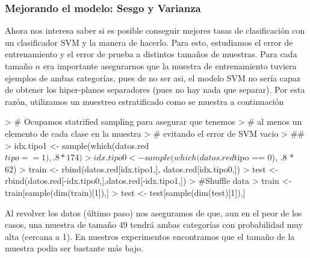\documentclass{article}
\begin{document}
\subsubsection{Mejorando el modelo: Sesgo y Varianza}
Ahora nos interesa saber si es posible conseguir mejores tasas de clasificación con un clasificador SVM y la manera de hacerlo. Para esto, estudiamos el error de entrenamiento y el error de prueba a distintos tamaños de muestras. Para cada tamaño $n$ era importante asegurarnos que la muestra de entrenamiento tuviera ejemplos de ambas categorías, pues de no ser asi, el modelo SVM no sería capaz de obtener los hiper-planos separadores (pues no hay nada que separar). Por esta razón, utilizamos un muestreo estratificado como se muestra a continuación
\begin{Schunk}
\begin{Sinput}
> # Ocupamos statrified sampling para asegurar que tenemos
> # al menos un elemento de cada clase en la muestra
> # evitando el error de SVM vacio
> ##
> idx.tipo1 <- sample(which(datos.red$tipo == 1), .8 * 174)
> idx.tipo0 <- sample(which(datos.red$tipo == 0), .8 * 62)
> train <- rbind(datos.red[idx.tipo1,], datos.red[idx.tipo0,])
> test <- rbind(datos.red[-idx.tipo0,],datos.red[-idx.tipo1,])
> #Shuffle data
> train <- train[sample(dim(train)[1]),]
> test <- test[sample(dim(test)[1]),]
\end{Sinput}
\end{Schunk}
Al revolver los datos (último paso) nos aseguramos de que, aun en el peor de los casos, una muestra de tamaño 49 tendrá ambas categorías con probabilidad muy alta (cercana a 1). En nuestros experimentos encontramos que el tamaño de la muestra podia ser bastante más bajo. 
\end{document}
